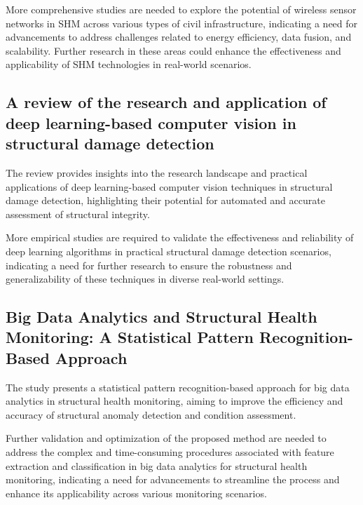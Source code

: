 \documentclass[journal, a4paper]{IEEEtran}
\begin{document}
\begin{description}[style=standard, font=\normalfont]
  \item[Research gap:] More comprehensive studies are needed to explore the potential of wireless sensor networks in SHM across various types of civil infrastructure, indicating a need for advancements to address challenges related to energy efficiency, data fusion, and scalability. Further research in these areas could enhance the effectiveness and applicability of SHM technologies in real-world scenarios.
\end{description}


\subsection{A review of the research and application of deep learning-based computer vision in structural damage detection}
The review provides insights into the research landscape and practical applications of deep learning-based computer vision techniques in structural damage detection, highlighting their potential for automated and accurate assessment of structural integrity. 

\begin{description}[style=standard, font=\normalfont]
  \item[Research gap:] More empirical studies are required to validate the effectiveness and reliability of deep learning algorithms in practical structural damage detection scenarios, indicating a need for further research to ensure the robustness and generalizability of these techniques in diverse real-world settings.
\end{description}


\subsection{Big Data Analytics and Structural Health Monitoring: A Statistical Pattern Recognition-Based Approach}
The study presents a statistical pattern recognition-based approach for big data analytics in structural health monitoring, aiming to improve the efficiency and accuracy of structural anomaly detection and condition assessment. 

\begin{description}[style=standard, font=\normalfont]
  \item[Research gap:] Further validation and optimization of the proposed method are needed to address the complex and time-consuming procedures associated with feature extraction and classification in big data analytics for structural health monitoring, indicating a need for advancements to streamline the process and enhance its applicability across various monitoring scenarios.
\end{description}
\end{document}
